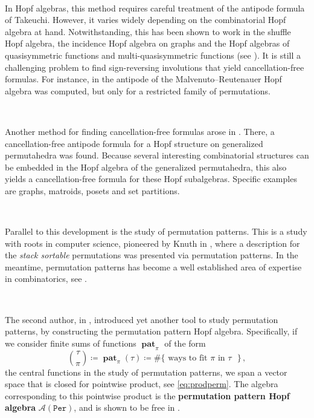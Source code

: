 \documentclass[12pt, reqno]{amsart}
\theoremstyle{definition}
\DeclareMathOperator{\pat}{\mathbf{pat}}
\begin{document}
\

In Hopf algebras, this method requires careful treatment of the antipode formula of Takeuchi.
However, it varies widely depending on the combinatorial Hopf algebra at hand.
Notwithstanding, this has been shown to work in the shuffle Hopf algebra, the incidence Hopf algebra on graphs and the Hopf algebras of quasisymmetric functions and multi-quasisymmetric functions (see \cite{BS2017}). It is still a challenging problem to find sign-reversing involutions that yield cancellation-free formulas.
For instance, in \cite{MalvenutoReutenauer,xu2022cancellation} the antipode of the Malvenuto–Reutenauer Hopf algebra was computed, but only for a restricted family of permutations.

\

Another method for finding cancellation-free formulas arose in \cite{aguiar2017hopf}.
There, a cancellation-free antipode formula for a Hopf structure on generalized permutahedra was found. 
Because several interesting combinatorial structures can be embedded in the Hopf algebra of the generalized permutahedra, this also yields a cancellation-free formula for these Hopf subalgebras.
Specific examples are graphs, matroids, posets and set partitions.

\

Parallel to this development is the study of permutation patterns.
This is a study with roots in computer science, pioneered by Knuth in \cite{Knuth}, where a description for the \textit{stack sortable} permutations was presented via permutation patterns.
In the meantime, permutation patterns has become a well established area of expertise in combinatorics, see \cite{linton2010permutation}.

\

The second author, in \cite{Vargas}, introduced yet another tool to study permutation patterns, by constructing the permutation pattern Hopf algebra.
Specifically, if we consider finite sums of functions $\pat_{\pi}$ of the form 
$$ \binom{\tau}{\pi} \coloneqq \pat_{\pi}(\tau)\coloneqq  \#\{\text{ ways to fit $\pi$ in $\tau$ }\}\, ,$$
the central functions in the study of permutation patterns, we span a vector space that is closed for pointwise product, see \eqref{eq:prodperm}.
The algebra corresponding to this pointwise product is the \textbf{permutation pattern Hopf algebra} $\mathcal{A}(\mathtt{Per})$, and is shown to be free in \cite{Vargas}.
\end{document}
